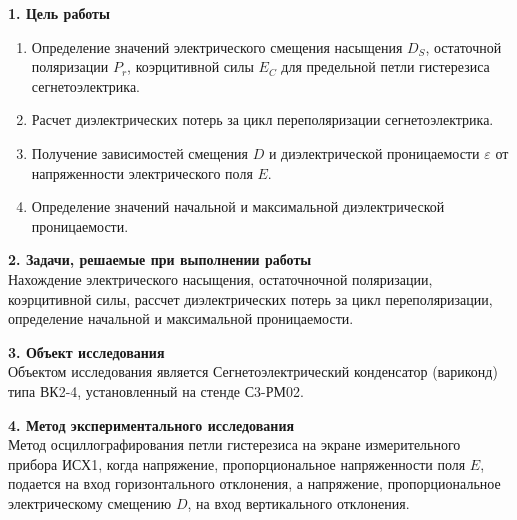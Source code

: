 \documentclass[12pt,fleqn]{article}
\begin{document}
\begin{justify}
    \textbf{1. Цель работы}
    \begin{enumerate}
        \item Определение значений электрического смещения насыщения $D_S$, остаточной поляризации $P_r$, коэрцитивной силы $E_C$ для предельной петли гистерезиса сегнетоэлектрика.
        \item Расчет диэлектрических потерь за цикл переполяризации сегнетоэлектрика. 
        \item Получение зависимостей смещения $D$ и диэлектрической проницаемости $\varepsilon$ от напряженности электрического поля $E$.
        \item Определение значений начальной и максимальной диэлектрической проницаемости.
    \end{enumerate}
\end{justify}

\begin{justify}
    \textbf{2. Задачи, решаемые при выполнении работы} \\
    Нахождение электрического насыщения, остаточночной поляризации, коэрцитивной силы, рассчет диэлектрических потерь за цикл переполяризации, определение начальной и максимальной проницаемости.
\end{justify}

\begin{justify}
    \textbf{3. Объект исследования} \\
    Объектом исследования является Сегнетоэлектрический конденсатор (вариконд) типа ВК2-4, установленный на стенде С3-РМ02.
\end{justify}

\begin{justify}
    \textbf{4. Метод экспериментального исследования} \\
    Метод осциллографирования петли гистерезиса на экране измерительного прибора ИСХ1, когда напряжение, пропорциональное напряженности поля $E$, подается на вход горизонтального отклонения, а напряжение, пропорциональное электрическому смещению $D$, на вход вертикального отклонения. 
\end{justify}
\end{document}
